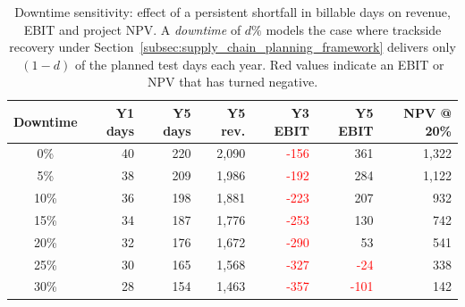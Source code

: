 \begin{table}[H]
\centering
\small
\caption{Downtime sensitivity: effect of a persistent shortfall in 
billable days on revenue, EBIT and project NPV. A \textit{downtime} 
of $d\%$ models the case where trackside recovery under Section~\ref{subsec:supply_chain_planning_framework}
delivers only $(1-d)$ of the planned test days each year. Red values indicate an EBIT 
or NPV that has turned negative.}
\label{tab:downtime}
\begin{tabular}{crrrrrr}
\toprule
\textbf{Downtime} & \textbf{Y1 days} & \textbf{Y5 days} & \textbf{Y5 rev.} & \textbf{Y3 EBIT} & \textbf{Y5 EBIT} & \textbf{NPV @ 20\%} \\
\midrule
0\% & 40 & 220 & 2,090 & \textcolor{red}{-156} & 361 & 1,322 \\
5\% & 38 & 209 & 1,986 & \textcolor{red}{-192} & 284 & 1,122 \\
10\% & 36 & 198 & 1,881 & \textcolor{red}{-223} & 207 & 932 \\
15\% & 34 & 187 & 1,776 & \textcolor{red}{-253} & 130 & 742 \\
20\% & 32 & 176 & 1,672 & \textcolor{red}{-290} & 53 & 541 \\
25\% & 30 & 165 & 1,568 & \textcolor{red}{-327} & \textcolor{red}{-24} & 338 \\
30\% & 28 & 154 & 1,463 & \textcolor{red}{-357} & \textcolor{red}{-101} & 142 \\
\bottomrule
\end{tabular}
\end{table}
